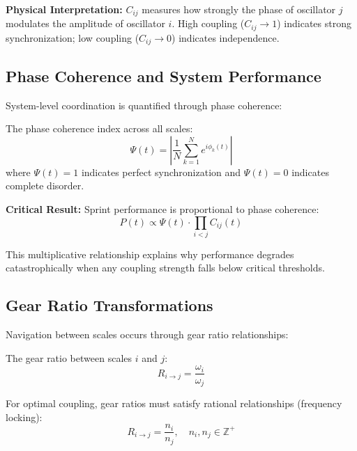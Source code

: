 \textbf{Physical Interpretation:} $C_{ij}$ measures how strongly the phase of oscillator $j$ modulates the amplitude of oscillator $i$. High coupling ($C_{ij} \to 1$) indicates strong synchronization; low coupling ($C_{ij} \to 0$) indicates independence.

\subsection{Phase Coherence and System Performance}

System-level coordination is quantified through phase coherence:

\begin{definition}
The phase coherence index across all scales:
\begin{equation}
\Psi(t) = \left|\frac{1}{N}\sum_{k=1}^{N} e^{i\phi_k(t)}\right|
\label{eq:phase_coherence}
\end{equation}
where $\Psi(t) = 1$ indicates perfect synchronization and $\Psi(t) = 0$ indicates complete disorder.
\end{definition}

\textbf{Critical Result:} Sprint performance is proportional to phase coherence:
\begin{equation}
P(t) \propto \Psi(t) \cdot \prod_{i<j} C_{ij}(t)
\label{eq:performance_coherence}
\end{equation}

This multiplicative relationship explains why performance degrades catastrophically when any coupling strength falls below critical thresholds.

\subsection{Gear Ratio Transformations}

Navigation between scales occurs through gear ratio relationships:

\begin{definition}
The gear ratio between scales $i$ and $j$:
\begin{equation}
R_{i \to j} = \frac{\omega_i}{\omega_j}
\label{eq:gear_ratio}
\end{equation}
\end{definition}

For optimal coupling, gear ratios must satisfy rational relationships (frequency locking):
\begin{equation}
R_{i \to j} = \frac{n_i}{n_j}, \quad n_i, n_j \in \mathbb{Z}^+
\label{eq:frequency_lock}
\end{equation}

